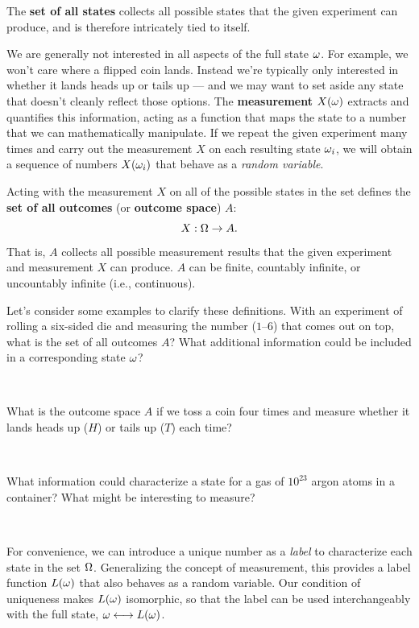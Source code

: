 The \textbf{set of all states} \Om collects all possible states \om that the given experiment \cE can produce, and is therefore intricately tied to \cE itself.

We are generally not interested in all aspects of the full state $\omega$.
For example, we won't care where a flipped coin lands.
Instead we're typically only interested in whether it lands heads up or tails up --- and we may want to set aside any state that doesn't cleanly reflect those options.
The \textbf{measurement} $X(\omega)$ extracts and quantifies this information, acting as a function that maps the state \om to a number that we can mathematically manipulate.
If we repeat the given experiment \cE many times and carry out the measurement $X$ on each resulting state $\omega_i$, we will obtain a sequence of numbers $X(\omega_i)$ that behave as a \textit{random variable}.

Acting with the measurement $X$ on all of the possible states in the set \Om defines the \textbf{set of all outcomes} (or \textbf{outcome space}) $A$:
\begin{equation*}
  X: \Omega \to A.
\end{equation*}
That is, $A$ collects all possible measurement results that the given experiment \cE and measurement $X$ can produce.
$A$ can be finite, countably infinite, or uncountably infinite (i.e., continuous).

Let's consider some examples to clarify these definitions.
With an experiment of rolling a six-sided die and measuring the number ($1$--$6$) that comes out on top, what is the set of all outcomes $A$?
What additional information could be included in a corresponding state $\omega$?
\begin{mdframed}
  \ \\[80 pt]
\end{mdframed}
What is the outcome space $A$ if we toss a coin four times and measure whether it lands heads up ($H$) or tails up ($T$) each time? %
\begin{mdframed}
  \ \\[80 pt]
\end{mdframed}
What information could characterize a state \om for a gas of $10^{23}$ argon atoms in a container?
What might be interesting to measure?
\begin{mdframed}
  \ \\[80 pt]
\end{mdframed}

For convenience, we can introduce a unique number as a \textit{label} to characterize each state \om in the set $\Omega$. %
Generalizing the concept of measurement, this provides a label function $L(\omega)$ that also behaves as a random variable.
Our condition of uniqueness makes $L(\omega)$ isomorphic, so that the label can be used interchangeably with the full state, $\omega \longleftrightarrow L(\omega)$.

